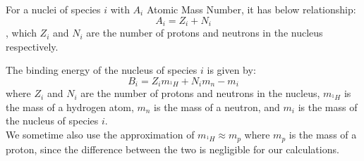 \bigskip \noindent
\begin{foundation}
    For a nuclei of species $i$ with $A_i$ Atomic Mass Number, it has below relationship:
    \[
        A_i = Z_i + N_i
    \],
    which $Z_i$ and $N_i$ are the number of protons and neutrons in the nucleus respectively. \\
\end{foundation}


\bigskip \noindent
\begin{theory}
    The binding energy of the nucleus of species $i$ is given by:
    \[
        B_i = Z_i m_{^{1}H} + N_i m_n - m_i
    \]
    where $Z_i$ and $N_i$ are the number of protons and neutrons in the nucleus, $m_{^{1}H}$ is the mass of a hydrogen atom, $m_n$ is the mass of a neutron, and $m_i$ is the mass of the nucleus of species $i$. \\
    
    We sometime also use the approximation of $m_{^{1}H} \approx m_p$ where $m_p$ is the mass of a proton, since the difference between the two is negligible for our calculations.
\end{theory}

\bigskip \noindent \bigskip \noindent \bigskip \noindent
